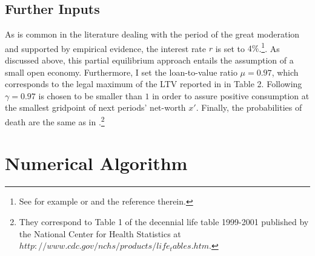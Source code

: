\documentclass[a4paper,12pt,legno]{article}
\begin{document}
\subsection{Further Inputs}

As is common in the literature dealing with the period of the great moderation and supported by empirical evidence, the interest rate $r$ is set to $4\%$.\footnote{See for example \cite{FV&K2011} or \cite{hintermaier2011} and the reference therein.}. As discussed above, this partial equilibrium approach entails the assumption of a small open economy. Furthermore, I set the loan-to-value ratio $\mu = 0.97$, which corresponds to the legal maximum of the LTV reported in \cite{green2005american} in Table 2. Following \cite{hintermaier2010} $\gamma = 0.97$ is chosen to be smaller than $1$ in order to assure positive consumption at the smallest gridpoint of next periods' net-worth $x'$. Finally, the probabilities of death are the same as in \cite{hintermaier2011}.\footnote{They correspond to Table 1 of the decennial life table 1999-2001 published by the National Center for Health Statistics at $http://www.cdc.gov/nchs/products/life_tables.htm$.} 

\section{Numerical Algorithm}
\end{document}
